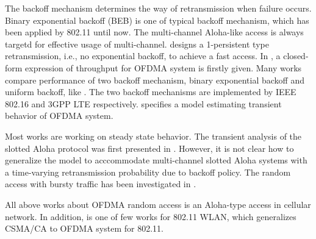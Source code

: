 The backoff mechanism determines the way of retransmission when failure occurs. 
Binary exponential backoff (BEB) is one of typical backoff mechanism, which has been applied by 802.11 until now.
The multi-channel Aloha-like access is always targetd for effective usage of multi-channel. 
\cite{choi2006multichannel} designs a 1-persistent type retransmission, i.e., no exponential backoff, to achieve a fast access.  
In \cite{zhou2008efficient}, a closed-form expression of throughput for OFDMA system is firstly given.
Many works compare performance of two backoff mechanism, binary exponential backoff and uniform backoff, like \cite{zhou2008efficient} \cite{seo2011design} \cite{kim2012performance}.
The two backoff mechanisms are implemented by IEEE 802.16 and 3GPP LTE respectively.  \cite{wei2015modeling} specifies a model estimating transient behavior of OFDMA system.

Most works are working on steady state behavior. The transient analysis of the slotted Aloha protocol was first presented in \cite{ren1995transient}. 
However, it is not clear how to  generalize the model to acccommodate multi-channel slotted Aloha systems with a time-varying retransmission probability due to backoff policy.
The random access with bursty traffic has been investigated in \cite{wei2012modeling} \cite{wu2013fasa}.

All above works about OFDMA random access is an Aloha-type access in cellular network.
In addition, \cite{GeneralizedOFDMACSMACA} is one of few works for 802.11 WLAN, which generalizes CSMA/CA to OFDMA system for 802.11. 



